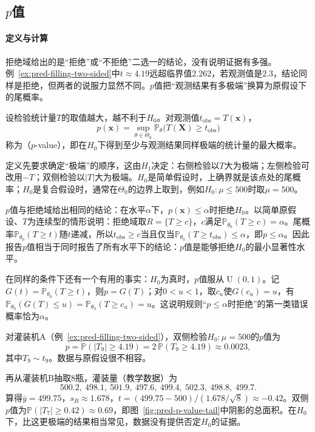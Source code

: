 \subsection{$p$值}

\paragraph{定义与计算}

拒绝域给出的是“拒绝”或“不拒绝”二选一的结论，没有说明证据有多强。例~\ref{ex:pred-filling-two-sided}中$t\approx4.19$远超临界值$2.262$，若观测值是$2.3$，结论同样是拒绝，但两者的说服力显然不同。$p$值把“观测结果有多极端”换算为原假设下的尾概率。

\begin{definition}[$p$值]
\label{def:pred-p-value}
设检验统计量$T$的取值越大，越不利于$H_0$。对观测值$t_{\mathrm{obs}}=T(\bm x)$，
\[
 p(\bm x)=\sup_{\theta\in\Theta_0}\mathbb P_\theta\bigl(T(\bm X)\geq t_{\mathrm{obs}}\bigr)
\]
称为（$p$-value），即在$H_0$下得到至少与观测结果同样极端的统计量的最大概率。
\end{definition}

定义先要求确定“极端”的顺序，这由$H_1$决定：右侧检验以$T$大为极端；左侧检验可改用$-T$；双侧检验以$|T|$大为极端。$H_0$是简单假设时，上确界就是该点处的尾概率；$H_0$是复合假设时，通常在$\Theta_0$的边界上取到，例如$H_0:\mu\leq500$时取$\mu=500$。

$p$值与拒绝域给出相同的结论：在水平$\alpha$下，$p(\bm x)\leq\alpha$时拒绝$H_0$。以简单原假设、$T$为连续型的情形说明：拒绝域取$R=\{T\geq c\}$，$c$满足$\mathbb P_{\theta_0}(T\geq c)=\alpha$。尾概率$\mathbb P_{\theta_0}(T\geq t)$随$t$递减，所以$t_{\mathrm{obs}}\geq c$当且仅当$\mathbb P_{\theta_0}(T\geq t_{\mathrm{obs}})\leq\alpha$，即$p\leq\alpha$。因此报告$p$值相当于同时报告了所有水平下的结论：$p$值是能够拒绝$H_0$的最小显著性水平。

在同样的条件下还有一个有用的事实：$H_0$为真时，$p$值服从$\operatorname U(0,1)$。记$G(t)=\mathbb P_{\theta_0}(T\geq t)$，则$p=G(T)$；对$0<u<1$，取$c_u$使$G(c_u)=u$，有$\mathbb P_{\theta_0}(G(T)\leq u)=\mathbb P_{\theta_0}(T\geq c_u)=u$。这说明规则“$p\leq\alpha$时拒绝”的第一类错误概率恰为$\alpha$。

\begin{example}[两台灌装机的$p$值]
\label{ex:pred-p-values}
对灌装机A（例~\ref{ex:pred-filling-two-sided}），双侧检验$H_0:\mu=500$的$p$值为
\[
 p=\mathbb P(|T_9|\geq4.19)=2\,\mathbb P(T_9\geq4.19)\approx0.0023,
\]
其中$T_9\sim t_9$。数据与原假设很不相容。

再从灌装机B抽取$8$瓶，灌装量（教学数据）为
\[
 500.2,\ 498.1,\ 501.9,\ 497.6,\ 499.4,\ 502.3,\ 498.8,\ 499.7.
\]
算得$\bar y=499.75$，$s_B\approx1.678$，$t=(499.75-500)/(1.678/\sqrt8)\approx-0.42$。双侧$p$值为$\mathbb P(|T_7|\geq0.42)\approx0.69$，即图~\ref{fig:pred-p-value-tail}中阴影的总面积。在$H_0$下，比这更极端的结果相当常见，数据没有提供否定$H_0$的证据。
\end{example}

